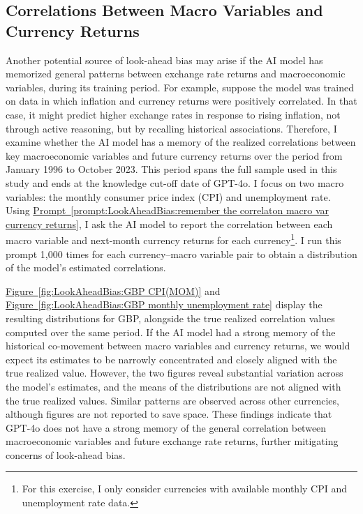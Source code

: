 \documentclass[12pt,oneside,letter]{article}
\newcommand*{\myfig}[1]{\hyperref[{#1}]{Figure~\ref*{#1}}}
\newcommand*{\myprp}[1]{\hyperref[{#1}]{Prompt~\ref*{#1}}}
\begin{document}
		\subsection{Correlations Between Macro Variables and Currency Returns}		\label{sec:Correlation Estimation}
		Another potential source of look-ahead bias may arise if the AI model has memorized general patterns between exchange rate returns and macroeconomic variables, during its training period. For example, suppose the model was trained on data in which inflation and currency returns were positively correlated. In that case, it might predict higher exchange rates in response to rising inflation, not through active reasoning, but by recalling historical associations. Therefore, I examine whether the AI model has a memory of the realized correlations between key macroeconomic variables and future currency returns over the period from January 1996 to October 2023. This period spans the full sample used in this study and ends at the knowledge cut-off date of GPT-4o. I focus on two macro variables: the monthly consumer price index (CPI) and unemployment rate. Using \myprp{prompt:LookAheadBias:remember the correlaton macro var currency returns}, I ask the AI model to report the correlation between each macro variable and next-month currency returns for each currency\footnote{For this exercise, I only consider currencies with available monthly CPI and unemployment rate data.}. I run this prompt 1,000 times for each currency–macro variable pair to obtain a distribution of the model’s estimated correlations.
		\begin{prompt}[H] 
			\centering
			\caption{}
			\label{prompt:LookAheadBias:remember the correlaton macro var currency returns}
		\end{prompt}
		\vspace{-20pt}\myfig{fig:LookAheadBias:GBP CPI(MOM)} and \myfig{fig:LookAheadBias:GBP monthly unemployment rate} display the resulting distributions for GBP, alongside the true realized correlation values computed over the same period. If the AI model had a strong memory of the historical co-movement between macro variables and currency returns, we would expect its estimates to be narrowly concentrated and closely aligned with the true realized value. However, the two figures reveal substantial variation across the model’s estimates, and the means of the distributions are not aligned with the true realized values. Similar patterns are observed across other currencies, although figures are not reported to save space. These findings indicate that GPT-4o does not have a strong memory of the general correlation between macroeconomic variables and future exchange rate returns, further mitigating concerns of look-ahead bias.
\end{document}
